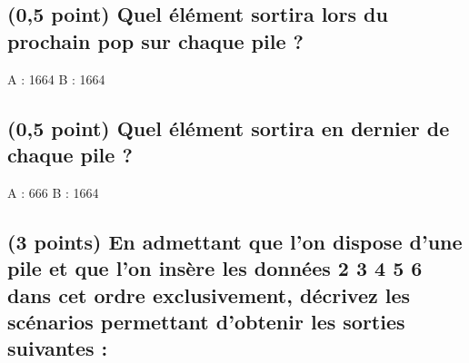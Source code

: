 \documentclass[11pt,a4paper]{article}
\begin{document}
\bigskip


\subsection{(0,5 point) Quel élément sortira lors du prochain \og pop \fg{} sur chaque pile ? }

\bigskip
\bigskip

\begin{Large}
A : 1664 \hspace{7.5cm}  B : 1664
\end{Large}

\bigskip
\bigskip


\subsection{(0,5 point) Quel élément sortira en dernier de chaque pile ? }

\bigskip
\bigskip

\begin{Large}
A : 666 \hspace{7.5cm}  B : 1664
\end{Large}

\bigskip
\bigskip



\hspace{0pt}
\vfill

\newpage

\subsection{(3 points) En admettant que l'on dispose d'une pile et que l'on insère les données  2 3 4 5 6 \fg{} dans cet ordre exclusivement, décrivez les scénarios permettant d'obtenir les sorties suivantes : }
\end{document}
